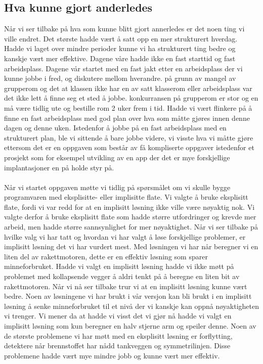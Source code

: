 \subsection{Hva kunne gjort anderledes}
Når vi ser tilbake på hva som kunne blitt gjort annerledes er det noen ting vi ville endret. Det største hadde vært å satt opp en mer strukturert hverdag. Hadde vi laget over mindre perioder kunne vi ha strukturert ting bedre og kanskje vært mer effektive. Dagene våre hadde ikke en fast starttid og fast arbeidsplass. Dagene vår startet med en fast jakt etter en arbeidsplass der vi kunne jobbe i fred, og diskutere mellom hverandre. på grunn av mangel av grupperom og det at klassen ikke har en av satt klasserom eller arbeidsplass var det ikke lett å finne seg et sted å jobbe. konkurransen på grupperom er stor og en må være tidlig ute og bestille rom 2 uker frem i tid. Hadde vi vært flinkere på å finne en fast arbeidsplass med god plan over hva som måtte gjøres innen denne dagen og denne uken. Istedenfor å jobbe på en fast arbeidsplass med en strukturert plan, ble vi sittende å bare jobbe videre, vi visste hva vi måtte gjøre ettersom det er en oppgaven som består av få kompliserte oppgaver istedenfor et prosjekt som for eksempel utvikling av en app der det er mye forskjellige implantasjoner en på holde styr på.\\ \\
Når vi startet oppgaven møtte vi tidlig på spørsmålet om vi skulle bygge programvaren med eksplisitte- eller implisitte flate. Vi valgte å bruke eksplisitt flate, fordi vi var redd for at en implisitt løsning ikke ville være nøyaktig nok. Vi valgte derfor å bruke eksplisitt flate som hadde større utfordringer og krevde mer arbeid, men hadde større sannsynlighet for mer nøyaktighet. Når vi ser tilbake på hvilke valg vi har tatt og hvordan vi har valgt å løse forskjellige problemer, er implisitt løsning det vi har vurdert mest. Med løsningen vi har når beregner vi en liten del av rakettmotoren, dette er en effektiv løsning som sparer minneforbruket. Hadde vi valgt en implisitt løsning hadde vi ikke møtt på problemet med kollapsende vegger å aldri tenkt på å beregne en liten bit av rakettmotoren. Når vi nå ser tilbake trur vi at en implisitt løsning kunne vært bedre. Noen av løsningene vi har brukt i vår versjon kan bli brukt i en implisitt løsning å senke minneforbruket til et nivå der vi kanskje kan oppnå nøyaktigheten vi trenger. Vi mener da at hadde vi visst det vi gjør nå hadde vi valgt en implisitt løsning som kun beregner en halv stjerne arm og speiler denne. Noen av de største problemene vi har møtt med en eksplisitt løsning er forflytting, detektere når brennstoffet har nådd tankveggen og symmetrilinjen. Disse problemene hadde vært mye mindre jobb og kunne vært mer effektiv.


